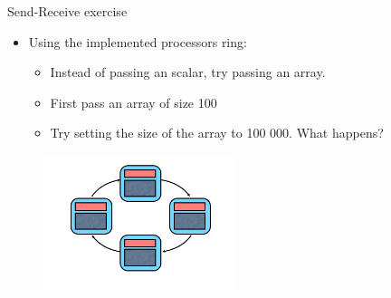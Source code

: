 \begin{frame}[fragile]{Send-Receive exercise}

\begin{itemize}
\item Using the implemented processors ring: 
    \begin{itemize}
    \item Instead of passing an scalar, try passing an array. 
      \vspace{2mm}
    \item First pass an array of size 100
      \vspace{2mm}
     \item Try setting the size of the array to 100 000. What happens? 
    \end{itemize}
\end{itemize}

\begin{figure}
    \centering
    \includegraphics[width=0.5\textwidth]{img/mpiring.png}
\end{figure} 
   
 
    
\end{frame}


